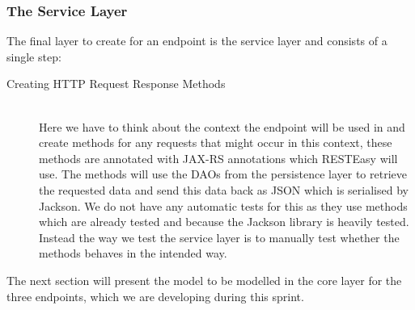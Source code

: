 \subsubsection{The Service Layer}
The final layer to create for an endpoint is the service layer and consists of a single step:
\begin{description}
	\item[Creating HTTP Request Response Methods]\hfill \\
	Here we have to think about the context the endpoint will be used in and create methods for any requests that might occur in this context, these methods are annotated with JAX-RS annotations which RESTEasy will use.
	The methods will use the DAOs from the persistence layer to retrieve the requested data and send this data back as JSON which is serialised by Jackson.
	We do not have any automatic tests for this as they use methods which are already tested and because the Jackson library is heavily tested.
	Instead the way we test the service layer is to manually test whether the methods behaves in the intended way.
\end{description}
\noindent
The next section will present the model to be modelled in the core layer for the three endpoints, which we are developing during this sprint.

